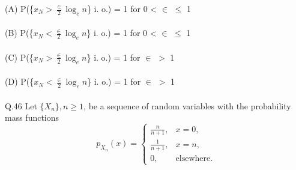 \documentclass{book}[200pt]
\begin{document}
{(A) P(\{$x_N > \frac{\in}{2}\log_en$\} i. o.) = 1 for 0 < $\in$ $\leq$ 1\\
\\
(B) P(\{$x_N < \frac{\in}{2}\log_en$\} i. o.) = 1 for 0 < $\in$ $\leq$ 1\\
\\
(C) P(\{$x_N > \frac{\in}{2}\log_en$\} i. o.) = 1 for $\in$ $>$ 1\\
\\
(D) P(\{$x_N < \frac{\in}{2}\log_en$\} i. o.) = 1 for $\in$ $>$ 1\\
\\
Q.46 Let \(\{X_n\}, n \ge 1\), be a sequence of random variables with the probability mass functions
\[
p_{X_n}(x) = 
\begin{cases}
	\frac{n}{n+1}, & x = 0, \\[6pt]
	\frac{1}{n+1}, & x = n, \\[6pt]
	0, & \text{elsewhere}.
\end{cases}
\]

}
\end{document}
